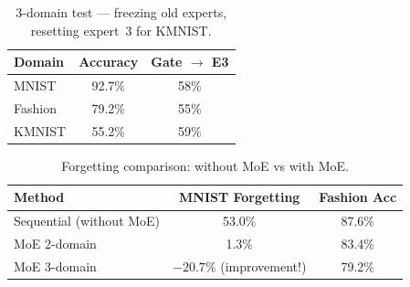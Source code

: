 \begin{table}[h]
\centering
\caption{3-domain test --- freezing old experts, resetting expert~3 for KMNIST.}
\begin{tabular}{l c c}
\hline
\textbf{Domain} & \textbf{Accuracy} & \textbf{Gate $\to$ E3} \\
\hline
MNIST & 92.7\% & 58\% \\
Fashion & 79.2\% & 55\% \\
KMNIST & 55.2\% & 59\% \\
\hline
\end{tabular}
\end{table}

\begin{table}[h]
\centering
\caption{Forgetting comparison: without MoE vs with MoE.}
\begin{tabular}{l c c}
\hline
\textbf{Method} & \textbf{MNIST Forgetting} & \textbf{Fashion Acc} \\
\hline
Sequential (without MoE) & 53.0\% & 87.6\% \\
MoE 2-domain & 1.3\% & 83.4\% \\
MoE 3-domain & $-20.7\%$ (improvement!) & 79.2\% \\
\hline
\end{tabular}
\end{table}
